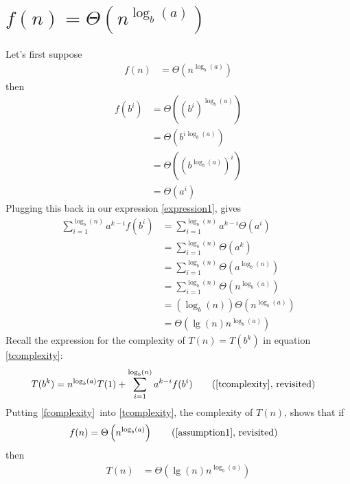\documentclass{article}
\begin{document}
\pagebreak
\section{$f(n) = \Theta\left(n^{\log_b(a)}\right)$}
Let's first suppose
\LARGE
\begin{align}
  f(n) &= \Theta\left(n^{\log_b(a)}\right) \label{assumption1}
\end{align}
\normalsize
then
\LARGE
\begin{align}
f(b^i) &= \Theta\left((b^i)^{\log_b(a)}\right)\\
 &= \Theta\left(b^{i\log_b(a)}\right)\\
&= \Theta\left(\left(b^{\log_b(a)}\right)^i\right)\\
&= \Theta(a^i)
\end{align}
\normalsize
Plugging this back in our expression \ref{expression1}, gives
\LARGE
\begin{align}
\sum_{i=1}^{\log_b(n)} a^{k-i}f(b^{i}) &= \sum_{i=1}^{\log_b(n)} a^{k-i}\Theta(a^i)\\
&= \sum_{i=1}^{\log_b(n)} \Theta(a^k)\\
&= \sum_{i=1}^{\log_b(n)} \Theta(a^{\log_b(n)})\\
&= \sum_{i=1}^{\log_b(n)} \Theta(n^{\log_b(a)})\\
&= (\log_b(n)) \Theta(n^{\log_b(a)})\\
&=  \Theta(\lg(n)n^{\log_b(a)}) \label{fcomplexity}
\end{align}
\normalsize
Recall the expression for the complexity of $T(n)=T(b^k)$ in equation
\ref{tcomplexity}: 
\LARGE
\begin{align*}
T(b^k)
&=
n^{\log_b(a)}T(1) + \sum_{i=1}^{\log_b(n)} a^{k-i}f(b^{i})
\tag{\ref{tcomplexity}, revisited}
\end{align*}
\normalsize
Putting \ref{fcomplexity}\  into
\ref{tcomplexity}, the complexity of $T(n)$, 
shows that if
\LARGE
\begin{align*}
f(n) &= \Theta\left(n^{\log_b(a)}\right)\tag{\ref{assumption1}, revisited}
\end{align*}
\normalsize
then
\LARGE
\begin{align}
T(n) &= \Theta\left(\lg(n)n^{\log_b(a)}\right)
\end{align}

\pagebreak
\end{document}
